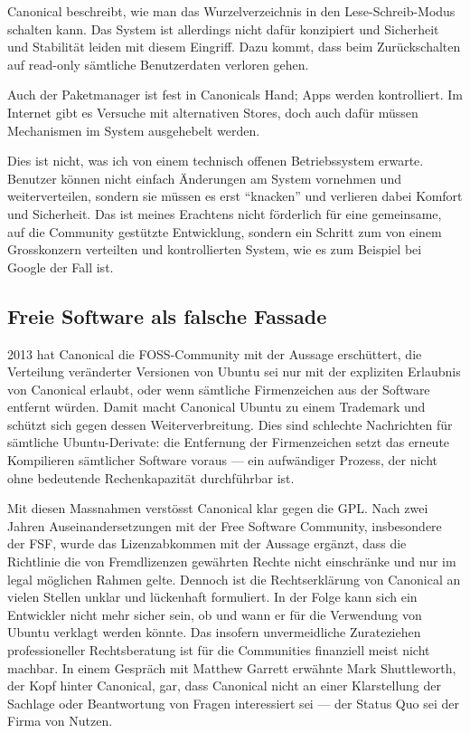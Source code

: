 Canonical beschreibt, wie man das Wurzelverzeichnis in den \mbox{Lese-Schreib-Modus} schalten kann\thinspace\cite{online:ubuntutouch-readwrite}. Das System ist allerdings nicht dafür konzipiert und Sicherheit und Stabilität leiden mit diesem Eingriff. Dazu kommt, dass beim Zurückschalten auf \mbox{read-only} sämtliche Benutzerdaten verloren gehen.

Auch der Paketmanager ist fest in Canonicals Hand; Apps werden kontrolliert\thinspace\cite{online:ubuntutouch-publish}. Im Internet gibt es Versuche mit alternativen Stores, doch auch dafür müssen Mechanismen im System ausgehebelt werden\thinspace\cite{online:ubuntutouch-jailbreak}.

Dies ist nicht, was ich von einem technisch offenen Betriebssystem erwarte. Benutzer können nicht einfach Änderungen am System vornehmen und weiterverteilen, sondern sie müssen es erst ``knacken'' und verlieren dabei Komfort und Sicherheit. Das ist meines Erachtens nicht förderlich für eine gemeinsame, auf die Community gestützte Entwicklung, sondern ein Schritt zum von einem Grosskonzern verteilten und kontrollierten System, wie es zum Beispiel bei Google der Fall ist.
\newline

\subsection{Freie Software als falsche Fassade}
2013 hat Canonical die \mbox{FOSS-Community} mit der Aussage erschüttert, die Verteilung veränderter Versionen von Ubuntu sei nur mit der expliziten Erlaubnis von Canonical erlaubt, oder wenn sämtliche Firmenzeichen aus der Software entfernt würden\thinspace\cite{online:ubuntutouch-mjgIn}. Damit macht Canonical Ubuntu zu einem Trademark und schützt sich gegen dessen Weiterverbreitung. Dies sind schlechte Nachrichten für sämtliche \mbox{Ubuntu-Derivate}: die Entfernung der Firmenzeichen setzt das erneute Kompilieren sämtlicher Software voraus\thinspace\cite{online:ubuntutouch-mjgLicense} --- ein aufwändiger Prozess, der nicht ohne bedeutende Rechenkapazität durchführbar ist.

Mit diesen Massnahmen verstösst Canonical klar gegen die GPL\thinspace\cite{online:ubuntutouch-fsf}. Nach zwei Jahren Auseinandersetzungen mit der Free Software Community, insbesondere der FSF, wurde das Lizenzabkommen mit der Aussage ergänzt, dass die Richtlinie die von Fremdlizenzen gewährten Rechte nicht einschränke und nur im legal möglichen Rahmen gelte\thinspace\cite{online:ubuntutouch-ip}. Dennoch ist die Rechtserklärung von Canonical an vielen Stellen unklar und lückenhaft formuliert\thinspace\cite{online:ubuntutouch-uncertain}. In der Folge kann sich ein Entwickler nicht mehr sicher sein, ob und wann er für die Verwendung von Ubuntu verklagt werden könnte. Das insofern unvermeidliche Zurateziehen professioneller Rechtsberatung ist für die Communities finanziell meist nicht machbar\thinspace\cite{online:ubuntutouch-mjgLicense}. In einem Gespräch mit Matthew Garrett\thinspace\cite{online:ubuntutouch-mjgConversation} erwähnte Mark Shuttleworth, der Kopf hinter Canonical, gar, dass Canonical nicht an einer Klarstellung der Sachlage oder Beantwortung von Fragen interessiert sei --- der Status Quo sei der Firma von Nutzen.

